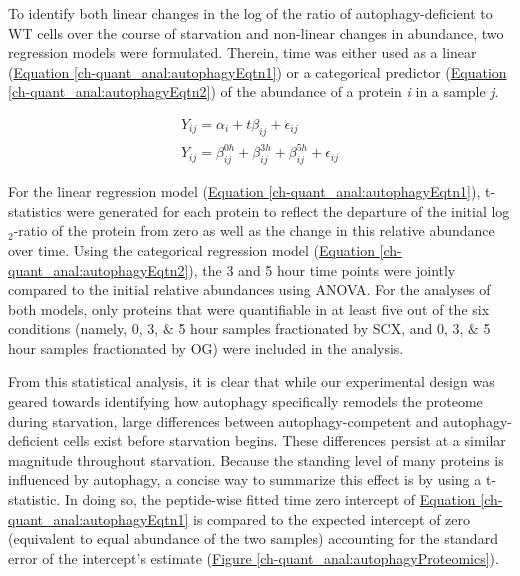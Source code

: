 To identify both linear changes in the log of the ratio of autophagy-deficient to WT cells over the course of starvation and non-linear changes in abundance, two regression models were formulated. Therein, time was either used as a linear (\hyperref[ch-quant_anal:autophagyEqtn1]{Equation \ref{ch-quant_anal:autophagyEqtn1}}) or a categorical predictor (\hyperref[ch-quant_anal:autophagyEqtn2]{Equation \ref{ch-quant_anal:autophagyEqtn2}}) of the abundance of a protein \textit{i} in a sample \textit{j}.

\begin{subequations}
\begin{align}
Y_{ij} = \alpha_{i} + t\beta_{ij} + \epsilon_{ij} \label{ch-quant_anal:autophagyEqtn1}\\
Y_{ij} = \beta^{0h}_{ij} + \beta^{3h}_{ij} + \beta^{5h}_{ij} + \epsilon_{ij} \label{ch-quant_anal:autophagyEqtn2}
\end{align}
\end{subequations}

For the linear regression model (\hyperref[ch-quant_anal:autophagyEqtn1]{Equation \ref{ch-quant_anal:autophagyEqtn1}}), t-statistics were generated for each protein to reflect the departure of the initial log$_2$-ratio of the protein from zero as well as the change in this relative abundance over time. Using the categorical regression model (\hyperref[ch-quant_anal:autophagyEqtn2]{Equation \ref{ch-quant_anal:autophagyEqtn2}}), the 3  and 5 hour time points were jointly compared to the initial relative abundances using ANOVA. For the analyses of both models, only proteins that were quantifiable in at least five out of the six conditions (namely, 0, 3, $\&$ 5 hour samples fractionated by SCX, and 0, 3, $\&$ 5 hour samples fractionated by OG) were included in the analysis. 

From this statistical analysis, it is clear that while our experimental design was geared towards identifying how autophagy specifically remodels the proteome during starvation, large differences between autophagy-competent and autophagy-deficient cells exist before starvation begins. These differences persist at a similar magnitude throughout starvation.  Because the standing level of many proteins is influenced by autophagy, a concise way to summarize this effect is by using a t-statistic. In doing so, the peptide-wise fitted time zero intercept of \hyperref[ch-quant_anal:autophagyEqtn1]{Equation \ref{ch-quant_anal:autophagyEqtn1}} is compared to the expected intercept of zero (equivalent to equal abundance of the two samples) accounting for the standard error of the intercept's estimate (\hyperref[ch-quant_anal:autophagyProteomics]{Figure \ref{ch-quant_anal:autophagyProteomics}}).

